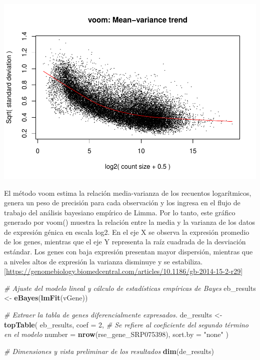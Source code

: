 \documentclass[
]{article}
\newenvironment{Shaded}{\begin{snugshade}}{\end{snugshade}}
\newcommand{\AttributeTok}[1]{\textcolor[rgb]{0.13,0.29,0.53}{#1}}
\newcommand{\CommentTok}[1]{\textcolor[rgb]{0.56,0.35,0.01}{\textit{#1}}}
\newcommand{\DecValTok}[1]{\textcolor[rgb]{0.00,0.00,0.81}{#1}}
\newcommand{\FunctionTok}[1]{\textcolor[rgb]{0.13,0.29,0.53}{\textbf{#1}}}
\newcommand{\NormalTok}[1]{#1}
\newcommand{\OtherTok}[1]{\textcolor[rgb]{0.56,0.35,0.01}{#1}}
\newcommand{\StringTok}[1]{\textcolor[rgb]{0.31,0.60,0.02}{#1}}
\begin{document}
\includegraphics{Proyecto_RNAseq_files/figure-latex/unnamed-chunk-12-1.pdf}

El método voom estima la relación media-varianza de los recuentos
logarítmicos, genera un peso de precisión para cada observación y los
ingresa en el flujo de trabajo del análisis bayesiano empírico de Limma.
Por lo tanto, este gráfico generado por voom() muestra la relación entre
la media y la varianza de los datos de expresión génica en escala log2.
En el eje X se observa la expresión promedio de los genes, mientras que
el eje Y representa la raíz cuadrada de la desviación estándar. Los
genes con baja expresión presentan mayor dispersión, mientras que a
niveles altos de expresión la varianza disminuye y se estabiliza.
{[}\url{https://genomebiology.biomedcentral.com/articles/10.1186/gb-2014-15-2-r29}{]}

\begin{Shaded}
\begin{Highlighting}[]
\CommentTok{\# Ajuste del modelo lineal y cálculo de estadísticas empíricas de Bayes}
\NormalTok{eb\_results }\OtherTok{\textless{}{-}} \FunctionTok{eBayes}\NormalTok{(}\FunctionTok{lmFit}\NormalTok{(vGene))}


\CommentTok{\# Extraer la tabla de genes diferencialmente expresados.}
\NormalTok{de\_results }\OtherTok{\textless{}{-}} \FunctionTok{topTable}\NormalTok{(}
\NormalTok{    eb\_results,}
    \AttributeTok{coef =} \DecValTok{2}\NormalTok{, }\CommentTok{\# Se refiere al coeficiente del segundo término en el modelo}
    \AttributeTok{number =} \FunctionTok{nrow}\NormalTok{(rse\_gene\_SRP075398),}
    \AttributeTok{sort.by =} \StringTok{"none"}
\NormalTok{)}

\CommentTok{\# Dimensiones y vista preliminar de los resultados}
\FunctionTok{dim}\NormalTok{(de\_results)}
\end{Highlighting}
\end{Shaded}
\end{document}
